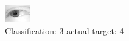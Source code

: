 \begin{figure}[h!]
\begin{center}
\includegraphics[width=0.60\columnwidth]{figures/ID2402_class_3_target_4.png}
\end{center}
\caption{ Classification: 3 actual target: 4}
\label{fig:ID2402_class_3_target_4}
\end{figure}
